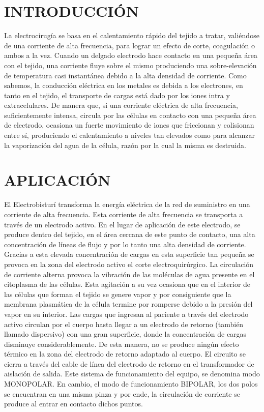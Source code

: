 \documentclass[10pt, conference, final, twocolumn, sansserif]{IEEEtran}
\begin{document}
\section{INTRODUCCIÓN}
La electrocirugía se basa en el calentamiento rápido del tejido a tratar, valiéndose de una corriente de alta frecuencia, para lograr un efecto de corte, coagulación o ambos a la vez. Cuando un delgado electrodo hace contacto en una pequeña área con el tejido, una corriente fluye sobre el mismo produciendo una sobre-elevación de temperatura casi instantánea debido a la alta densidad de corriente. Como sabemos, la conducción eléctrica en los metales es debida a los electrones, en tanto en el tejido, el transporte de cargas está dado por los iones intra y extracelulares. De manera que, si una corriente eléctrica de alta frecuencia, suficientemente intensa, circula por las células en contacto con una pequeña área de electrodo, ocasiona un fuerte movimiento de iones que friccionan y colisionan entre sí, produciendo el calentamiento a niveles tan elevados como para alcanzar la vaporización del agua de la célula, razón por la cual la misma es destruida.

\section{APLICACIÓN}
El Electrobisturí transforma la energía eléctrica de la red de suministro en una corriente de alta frecuencia. Esta corriente de alta frecuencia se transporta a través de un electrodo activo. En el lugar de aplicación de este electrodo, se produce dentro del tejido, en el área cercana de este punto de contacto, una alta concentración de líneas de flujo y por lo tanto una alta densidad de corriente. Gracias a esta elevada concentración de cargas en esta superficie tan pequeña se provoca en la zona del electrodo activo el corte electroquirúrgico. La circulación de corriente alterna provoca la vibración de las moléculas de agua presente en el citoplasma de las células. Esta agitación a su vez ocasiona que en el interior de las células que forman el tejido se genere vapor y por consiguiente que la membrana plasmática de la célula termine por romperse debido a la presión del vapor en su interior.
Las cargas que ingresan al paciente a través del electrodo activo circulan por el cuerpo hasta llegar a un electrodo de retorno (también llamado dispersivo) con una gran superficie, donde la concentración de cargas disminuye considerablemente. De esta manera, no se produce ningún efecto térmico en la zona del electrodo de retorno adaptado al cuerpo. El circuito se cierra a través del cable de línea del electrodo de retorno en el transformador de aislación de salida. Este sistema de funcionamiento del equipo, se denomina modo  MONOPOLAR. En cambio, el modo de funcionamiento BIPOLAR, los dos polos se encuentran en una misma pinza y por ende, la circulación de corriente se produce al entrar en contacto dichos puntos.
\end{document}
